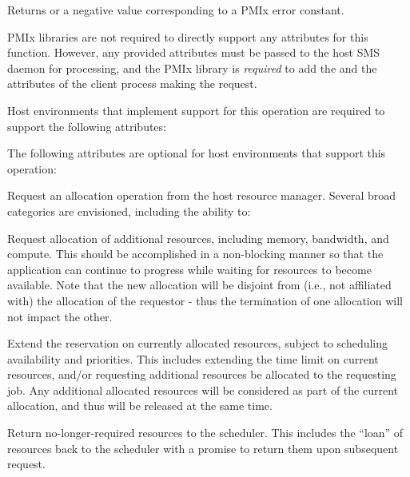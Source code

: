 Returns  or a negative value corresponding to a PMIx error constant.

\reqattrstart
\ac{PMIx} libraries are not required to directly support any attributes for this function. However, any provided attributes must be passed to the host \ac{SMS} daemon for processing, and the \ac{PMIx} library is \textit{required} to add the  and the  attributes of the client process making the request.

Host environments that implement support for this operation are required to support the following attributes:


\reqattrend

\optattrstart
The following attributes are optional for host environments that support this operation:


\optattrend

\descr

Request an allocation operation from the host resource manager.
Several broad categories are envisioned, including the ability to:

\begin{compactitem}
%
\item Request allocation of additional resources, including memory, bandwidth, and compute.
This should be accomplished in a non-blocking manner so that the application can continue to progress while waiting for resources to become available.
Note that the new allocation will be disjoint from (i.e., not affiliated with) the allocation of the requestor - thus the termination of one allocation will not impact the other.
%
\item Extend the reservation on currently allocated resources, subject to scheduling availability and priorities.
This includes extending the time limit on current resources, and/or requesting additional resources be allocated to the requesting job.
Any additional allocated resources will be considered as part of the current allocation, and thus will be released at the same time.
%
\item Return no-longer-required resources to the scheduler.
This includes the ``loan'' of resources back to the scheduler with a promise to return them upon subsequent request.
\end{compactitem}


